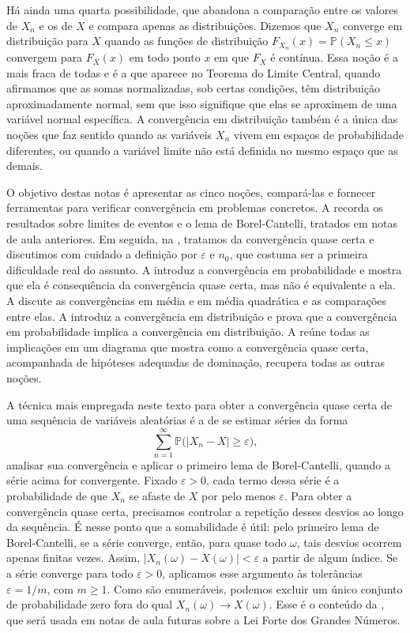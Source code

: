 \documentclass[12pt,portuguese]{article}
\theoremstyle{definition}
\theoremstyle{plainexercise}
\theoremstyle{starredexercise}
\theoremstyle{definition}
\begin{document}
Há ainda uma quarta possibilidade, que abandona a comparação entre os valores
de $X_n$ e os de $X$ e compara apenas as distribuições. Dizemos que $X_n$
converge em distribuição para $X$ quando as funções de distribuição
$F_{X_n}(x)=\mathbb{P}(X_n\leqslant x)$ convergem para $F_X(x)$ em todo ponto
$x$ em que $F_X$ é contínua. Essa noção é a mais fraca de todas e é a que
aparece no Teorema do Limite Central, quando afirmamos que as somas
normalizadas, sob certas condições, 
têm distribuição aproximadamente normal, sem que isso signifique
que elas se aproximem de uma variável normal específica. A convergência em
distribuição também é a única das noções que faz sentido quando as variáveis
$X_n$ vivem em espaços de probabilidade diferentes, ou quando a variável
limite não está definida no mesmo espaço que as demais.

O objetivo destas notas é apresentar as cinco noções, compará-las e fornecer
ferramentas para verificar convergência em problemas concretos. A
 recorda os resultados sobre limites de eventos e o lema
de Borel-Cantelli, tratados em notas de aula anteriores. Em seguida, na
, tratamos da convergência quase certa e discutimos com
cuidado a definição por $\varepsilon$ e $n_0$, que costuma ser a primeira
dificuldade real do assunto. A  introduz a convergência
em probabilidade e mostra que ela é consequência da convergência quase certa,
mas não é equivalente a ela. A  discute as convergências em
média e em média quadrática e as comparações entre elas. A
 introduz a convergência em distribuição e prova que a
convergência em probabilidade implica a convergência em distribuição.
A  reúne todas as
implicações em um diagrama que mostra como a convergência quase certa,
acompanhada de hipóteses adequadas de dominação, recupera todas as outras
noções.

A técnica mais empregada neste texto para obter a convergência quase certa
de uma sequência de variáveis aleatórias é a de se estimar séries da forma
\[
\sum_{n=1}^{\infty}\mathbb{P}\bigl(|X_n-X|\geqslant\varepsilon\bigr),
\]
analisar sua convergência e aplicar o primeiro lema de Borel-Cantelli,
quando a série acima for convergente. 
Fixado $\varepsilon>0$, cada termo dessa série é a probabilidade de que
$X_n$ se afaste de $X$ por pelo menos $\varepsilon$. Para obter a
convergência quase certa, precisamos controlar a repetição desses desvios
ao longo da sequência. É nesse ponto que a somabilidade é útil: pelo primeiro
lema de Borel-Cantelli, se a série converge, então, para quase todo $\omega$,
tais desvios ocorrem apenas finitas vezes. Assim,
$|X_n(\omega)-X(\omega)|<\varepsilon$ a partir de algum índice.
Se a série converge para todo $\varepsilon>0$, aplicamos esse argumento às
tolerâncias $\varepsilon=1/m$, com $m\geqslant1$. Como são enumeráveis,
podemos excluir um único conjunto de probabilidade zero fora do qual
$X_n(\omega)\to X(\omega)$. Esse é o conteúdo da
, que será usada em notas de aula futuras
sobre a Lei Forte dos Grandes Números.
\end{document}
